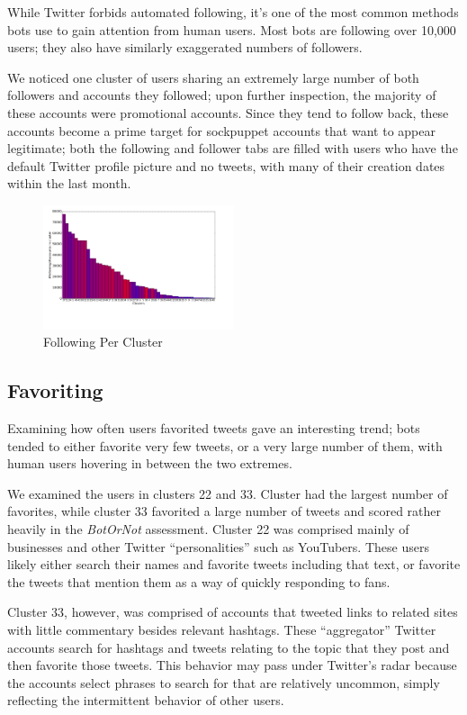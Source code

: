 \documentclass{sig-alternate-05-2015}
\begin{document}
While Twitter forbids automated following, it's one of the most common methods bots use to gain attention from human users. Most bots are following over 10,000 users; they also have similarly exaggerated numbers of followers.

We noticed one cluster of users sharing an extremely large number of both followers and accounts they followed; upon further inspection, the majority of these accounts were promotional accounts. Since they tend to follow back, these accounts become a prime target for sockpuppet accounts that want to appear legitimate; both the following and follower tabs are filled with users who have the default Twitter profile picture and no tweets, with many of their creation dates within the last month.

\begin{figure}[h!]
	\caption{Following Per Cluster}
	\centering
		\includegraphics[width=0.5\textwidth]{imgs/following}
\end{figure}

\subsection{Favoriting}

Examining how often users favorited tweets gave an interesting trend; bots tended to either favorite very few tweets, or a very large number of them, with human users hovering in between the two extremes.

We examined the users in clusters 22 and 33. Cluster had the largest number of favorites, while cluster 33 favorited a large number of tweets and scored rather heavily in the \emph{BotOrNot} assessment. Cluster 22 was comprised mainly of businesses and other Twitter ``personalities'' such as YouTubers. These users likely either search their names and favorite tweets including that text, or favorite the tweets that mention them as a way of quickly responding to fans.

Cluster 33, however, was comprised of accounts that tweeted links to related sites with little commentary besides relevant hashtags. These ``aggregator'' Twitter accounts search for hashtags and tweets relating to the topic that they post and then favorite those tweets. This behavior may pass under Twitter's radar because the accounts select phrases to search for that are relatively uncommon, simply reflecting the intermittent behavior of other users.
\end{document}
